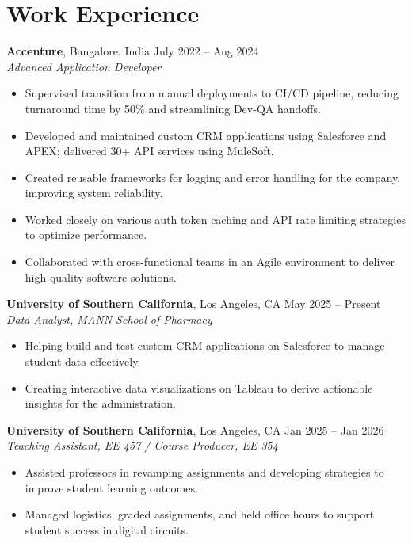\documentclass[letterpaper,10pt]{article}
\begin{document}
\section*{Work Experience}
\textbf{Accenture}, Bangalore, India \hfill July 2022 -- Aug 2024 \\
\textit{Advanced Application Developer}
\begin{itemize}
    \item Supervised transition from manual deployments to CI/CD pipeline, reducing turnaround time by 50\% and streamlining Dev-QA handoffs.
    \item Developed and maintained custom CRM applications using Salesforce and APEX; delivered 30+ API services using MuleSoft.
    \item Created reusable frameworks for logging and error handling for the company, improving system reliability.
    \item Worked closely on various auth token caching and API rate limiting strategies to optimize performance.
    \item Collaborated with cross-functional teams in an Agile environment to deliver high-quality software solutions.
\end{itemize}

\textbf{University of Southern California}, Los Angeles, CA \hfill May 2025 -- Present \\
\textit{Data Analyst, MANN School of Pharmacy}
\begin{itemize}
    \item Helping build and test custom CRM applications on Salesforce to manage student data effectively.
    \item Creating interactive data visualizations on Tableau to derive actionable insights for the administration.
\end{itemize}

\textbf{University of Southern California}, Los Angeles, CA \hfill Jan 2025 -- Jan 2026 \\
\textit{Teaching Assistant, EE 457 / Course Producer, EE 354}
\begin{itemize}
    \item Assisted professors in revamping assignments and developing strategies to improve student learning outcomes.
    \item Managed logistics, graded assignments, and held office hours to support student success in digital circuits.
\end{itemize}

\end{document}
